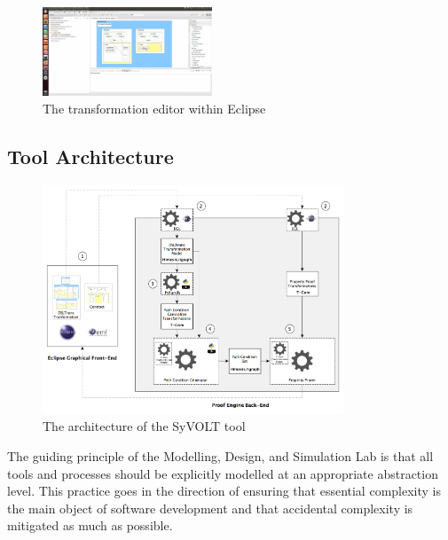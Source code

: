 
\begin{figure}
\centering
\includegraphics[width=0.45\textwidth]{figures/eclipse_frontend}
\caption{The transformation editor within Eclipse}
\label{fig:eclipse_frontend}
\end{figure}

\subsection{Tool Architecture}
\begin{figure}
\centering
\includegraphics[width=0.8\textwidth]{figures/syvolt_arch}
\caption{The architecture of the SyVOLT tool}
\label{fig:arch}
\end{figure}

The guiding principle of the Modelling, Design, and Simulation Lab is that all tools and processes should be
explicitly modelled at an appropriate abstraction level. This
practice goes in the direction of ensuring that essential complexity is the main
object of software development and that accidental complexity is mitigated as
much as possible.

